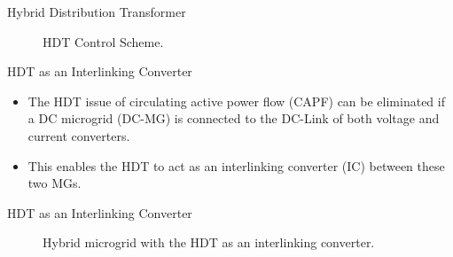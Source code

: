 \begin{frame}{Hybrid Distribution Transformer}
    \begin{figure}
        \centering
        \resizebox{!}{5.5cm}{}
        \caption{HDT Control Scheme.}
        \label{fig:HDT_Control}
    \end{figure}
\end{frame}

\begin{frame}{HDT as an Interlinking Converter}
        \begin{itemize}
            \item<1-2> The HDT issue of circulating active power flow (CAPF) can be eliminated if a DC microgrid (DC-MG) is connected to the DC-Link of both voltage and current converters.
            \item<1-2> This enables the HDT to act as an interlinking converter (IC) between these two MGs.
        \end{itemize}
\end{frame}

\begin{frame}{HDT as an Interlinking Converter}
    \begin{figure}
        \centering
        \resizebox{!}{6.3cm}{}
        \caption{Hybrid microgrid with the HDT as an interlinking converter.}
        \label{fig:HybridMG}
    \end{figure}
\end{frame}


